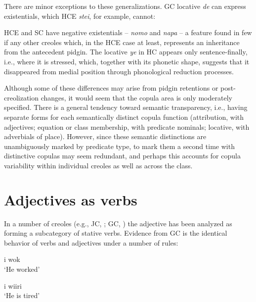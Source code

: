 There are minor exceptions to these generalizations. GC locative \textit{de} can express existentials, which HCE \textit{stei}, for example, cannot:

\z

\z

\z
HCE and SC have negative existentials -- \textit{nomo} and \textit{napa} -- a feature found in few if any other creoles which, in the HCE case at least, represents an inheritance from the antecedent pidgin. The locative \textit{ye} in HC appears only sentence-finally, i.e., where it is stressed, which, together with its phonetic shape, suggests that it disappeared from medial position through phonological reduction processes.


Although some of these differences may arise from pidgin retentions or post-creolization changes, it would seem that the copula area is only moderately specified. There is a general tendency toward semantic transparency, i.e., having separate forms for each semantically distinct copula function (attribution, with adjectives; equation or class membership, with predicate nominals; locative, with adverbials of place). However, since these semantic distinctions are unambiguously marked by predicate type, to mark them a second time with distinc\-tive copulas may seem redundant, and perhaps this accounts for copula variability within individual creoles as well as across the class.

\section{Adjectives as verbs}

In a number of creoles (e.g., JC, \citealt{Bailey1966}; GC, \citealt{Bickerton1973b}) the adjective has been analyzed as forming a subcategory of stative verbs. Evidence from GC is the identical behavior of verbs and adjectives under a number of rules:

\ea\label{ex:2:63}
 {i} {wok}\\
\glt `He worked'
\z

\ea\label{ex:2:64}
 i wiiri\\
\glt `He is tired'
\z

